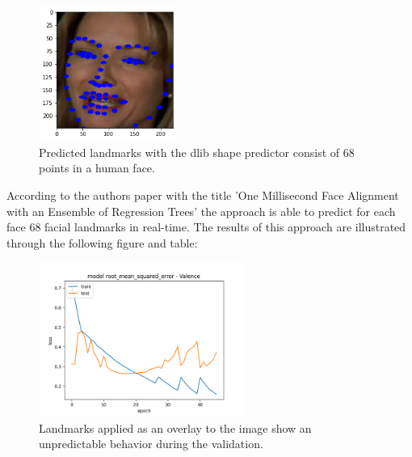 \begin{figure}[H]
  \begin{center}
  \includegraphics[angle=0, width=0.4\textwidth]{Figures/landmarks_as_dots.png}
  \caption{Predicted landmarks with the dlib shape predictor consist of 68 points in a human face.}
  \label{fig:LandmarkdsDots}
  \end{center}
\end{figure}

According to the authors paper with the title 'One Millisecond Face Alignment with an Ensemble of Regression Trees' \citep{Kazemi:2014:ShapePredictor} the approach is able to predict for each face 68 facial landmarks in real-time. The results of this approach are illustrated through the following figure and table:

\begin{figure}[H]
  \begin{center}
  \includegraphics[angle=0, width=0.6\textwidth]{Figures/rmse_out1_landmarks.png}
  \caption{Landmarks applied as an overlay to the image show an unpredictable behavior during the validation.}
  \label{fig:ASM}
  \end{center}
\end{figure}

